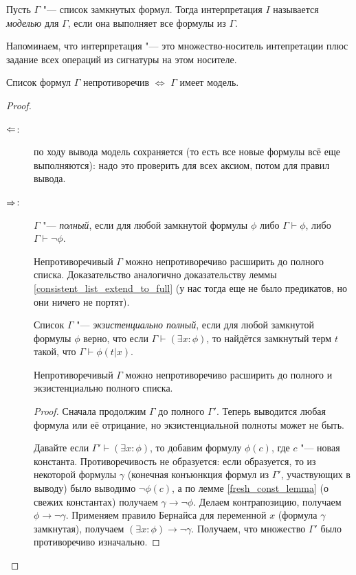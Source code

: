\begin{Def}
	Пусть $\Gamma$ "--- список замкнутых формул.
	Тогда интерпретация $I$ называется \textsl{моделью} для $\Gamma$, если
	она выполняет все формулы из $\Gamma$.

	Напоминаем, что интерпретация "--- это множество-носитель интепретации плюс
	задание всех операций из сигнатуры на этом носителе.
\end{Def}
\begin{theorem}
	Список формул $\Gamma$ непротиворечив $\iff$ $\Gamma$ имеет модель.
\end{theorem}
\begin{proof}
	\begin{description}
		\item[$\Leftarrow$:]
			по ходу вывода модель сохраняется (то есть все новые формулы всё еще выполняются):
			надо это проверить для всех аксиом, потом для правил вывода.
		\item[$\Rightarrow$:]
			\begin{Def}
				$\Gamma$ "--- \textsl{полный}, если для любой замкнутой формулы $\phi$
				либо $\Gamma \vdash \phi$, либо $\Gamma \vdash \lnot \phi$.
			\end{Def}
			\begin{lemma}
				Непротиворечивый $\Gamma$ можно непротиворечиво расширить до полного списка.
				Доказательство аналогично доказательству леммы \ref{consistent_list_extend_to_full} (у нас тогда
				еще не было предикатов, но они ничего не портят).
			\end{lemma}
			\begin{Def}
				Список $\Gamma$ "--- \textsl{экзистенциально полный}, если для любой замкнутой формулы $\phi$
				верно, что если $\Gamma \vdash (\exists x \colon \phi)$, то найдётся замкнутый терм $t$ такой,
				что $\Gamma \vdash \phi(t|x)$.
			\end{Def}
			\begin{lemma}
				Непротиворечивый $\Gamma$ можно непротиворечиво расширить до полного и экзистенциально полного списка.
			\end{lemma}
			\begin{proof}
				Сначала продолжим $\Gamma$ до полного $\Gamma'$.
				Теперь выводится любая формула или её отрицание, но экзистенциальной полноты может не быть.

				Давайте если $\Gamma' \vdash (\exists x \colon \phi)$, то добавим формулу $\phi(c)$, где $c$ "--- новая константа.
				Противоречивость не образуется: если образуется, то из некоторой формулы $\gamma$ (конечная конъюнкция формул из $\Gamma'$,
				участвующих в выводу) было выводимо $\lnot \phi(c)$,
				а по лемме \ref{fresh_const_lemma} (о свежих константах) получаем $\gamma \to \lnot \phi$.
				Делаем контрапозицию, получаем $\phi \to \lnot \gamma$.
				Применяем правило Бернайса для переменной $x$ (формула $\gamma$ замкнутая), получаем $(\exists x \colon \phi) \to \lnot \gamma$.
				Получаем, что множество $\Gamma'$ было противоречиво изначально.


\end{proof}
\end{description}
\end{proof}
